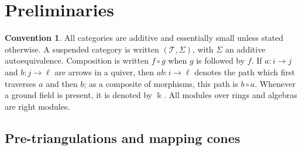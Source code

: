 \documentclass[a4paper,11pt,reqno]{amsart}
\theoremstyle{definition}
\newtheorem{convention}[convention]{Convention}
\theoremstyle{plain}
\numberwithin{equation}{section}
\newcommand{\T}{\mathcal T}
\newcommand{\kk}{\Bbbk}
\begin{document}
\section{Preliminaries}
\label{sec:preliminaries}

\begin{convention}
\label{conv:global}
All categories are additive and essentially small unless stated otherwise.
A suspended category is written $(\T,\Sigma)$, with $\Sigma$ an additive
autoequivalence.  Composition is written $f\circ g$ when $g$ is followed by
$f$.  If $a:i\to j$ and $b:j\to\ell$ are arrows in a quiver, then
$ab:i\to\ell$ denotes the path which first traverses $a$ and then $b$;
as a composite of morphisms, this path is $b\circ a$.
Whenever a ground field is present, it is denoted by \(\kk\).
All modules over rings and algebras are right modules.
\end{convention}

\subsection{Pre-triangulations and mapping cones}
\end{document}
